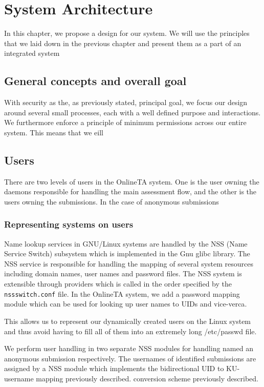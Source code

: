 \chapter{System Architecture}
In this chapter, we propose a design for our system. We will use the
principles that we laid down in the previous chapter and present them
as a part of an integrated system

\section{General concepts and overall goal}
With security as the, as previously stated, principal goal, we focus
our design around several small processes, each with a well defined
purpose and interactions. We furthermore enforce a principle of
minimum permissions across our entire system. This means that we eill 

\section{Users}
There are two levels of users in the OnlineTA system. One is the user
owning the daemons responsible for handling the main assessment flow,
and the other is the users owning the submissions. In the case of
anonymous submissions 

\subsection{Representing systems on users}
Name lookup services in GNU/Linux systems are handled by the NSS (Name
Service Switch) subsystem which is implemented in the Gnu glibc library. The NSS
service is responsible for handling the mapping of several system
resources including domain names, user names and password files. The
NSS system is extensible through providers which is called in the
order specified by the \texttt{nssswitch.conf} file. In the OnlineTA
system, we add a password mapping module which can be used for looking
up user names to UIDs and vice-verca\cite{nss}.

This allows us to represent our dynamically created users on the Linux
system and thus avoid having to fill all of them into an extremely
long /etc/passwd file.

We perform user handling in two separate NSS modules for handling
named an anonymous submission respectively. The usernames of
identified submissions are assigned by a NSS module which implements
the bidirectional UID to KU-username mapping previously described.
conversion scheme previously described.

